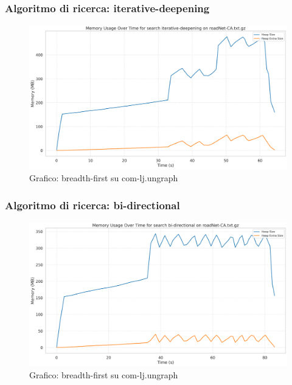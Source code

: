 \documentclass{article}
\begin{document}
\subsubsection{Algoritmo di ricerca: iterative-deepening}
\begin{figure}[h]\centering
	\includegraphics[width=\textwidth]{../plots/roadNet-CA_iterative-deepening.png}
	\caption{Grafico: breadth-first su com-lj.ungraph}
\end{figure}
\subsubsection{Algoritmo di ricerca: bi-directional}
\begin{figure}[h]\centering
	\includegraphics[width=\textwidth]{../plots/roadNet-CA_bi-directional.png}
	\caption{Grafico: breadth-first su com-lj.ungraph}
\end{figure}
\end{document}
